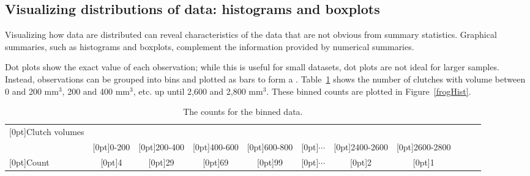 \begin{doublespace}

\subsection{Visualizing distributions of data: histograms and boxplots}
\label{histogramsBoxplots}

Visualizing how data are distributed can reveal characteristics of the data that are not obvious from summary statistics. Graphical summaries, such as histograms and boxplots, complement the information provided by numerical summaries.

Dot plots show the exact value of each observation; while this is useful for small datasets, dot plots are not ideal for larger samples. Instead, observations can be grouped into bins and plotted as bars to form a . Table~\ref{frogBinnedClutchVolTable} shows the number of clutches with volume between 0 and 200 $\textrm{mm}^{3}$, 200 and 400 $\textrm{mm}^{3}$, etc. up until 2,600 and 2,800 $\textrm{mm}^{3}$. These binned counts are plotted in Figure~\ref{frogHist}.

\begin{table}[ht]
	\centering\small
	\begin{tabular}{l ccc ccc ccc c}
		\hline
		\raisebox{-1.5ex}[0pt]{Clutch volumes} & \\
		& \raisebox{1.5ex}[0pt]{0-200} & \raisebox{1.5ex}[0pt]{200-400} & \raisebox{1.5ex}[0pt]{400-600} & \raisebox{1.5ex}[0pt]{600-800} & \raisebox{1.5ex}[0pt]{$\cdots$} & \raisebox{1.5ex}[0pt]{2400-2600} & \raisebox{1.5ex}[0pt]{2600-2800} \\
		\hline
		\raisebox{-.25ex}[0pt]{Count} & \raisebox{-.25ex}[0pt]{4} & \raisebox{-.25ex}[0pt]{29} & \raisebox{-.25ex}[0pt]{69} & \raisebox{-.25ex}[0pt]{99} & \raisebox{-.25ex}[0pt]{$\cdots$} & \raisebox{-.25ex}[0pt]{2} & \raisebox{-.25ex}[0pt]{1} \\
		\hline
	\end{tabular}
	\caption{The counts for the binned  data.}
	\label{frogBinnedClutchVolTable}
\end{table}


\end{doublespace}
